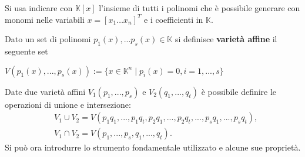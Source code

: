\begin{defn}
	Si usa indicare con $\mathbb{K}[x]$ l'insieme di tutti i polinomi che è possibile generare con monomi nelle variabili $x = [x_1 \dots x_n]^T$ e i coefficienti in $\mathbb{K}$.
\end{defn}

\begin{defn}
	Dato un set di polinomi $p_1(x), ... p_s(x) \in \mathbb{K}$ si definisce \textbf{varietà affine} il seguente set
	\begin{center}
		$V(p_1(x), ..., p_s(x)) := \{x \in \mathbb{K}^n  \; | \; p_i(x) = 0, i = 1, ..., s \}$
	\end{center} 
\end{defn}

Date due varietà affini $V_1(p_1, ..., p_s)$ e $V_2(q_1, ..., q_t)$ è possibile definire le operazioni di unione e intersezione:
\begin{align}
	\nonumber
	& V_1 \cup V_2 = V(p_1q_1, ...,p_1q_t, p_2q_1, ..., p_2q_t, ..., p_sq_1, ..., p_sq_t), \\
	\nonumber
	& V_1 \cap V_2 = V(p_1, ..., p_s, q_1, ..., q_t).
\end{align}
Si può ora introdurre lo strumento fondamentale utilizzato e alcune sue proprietà.
	
